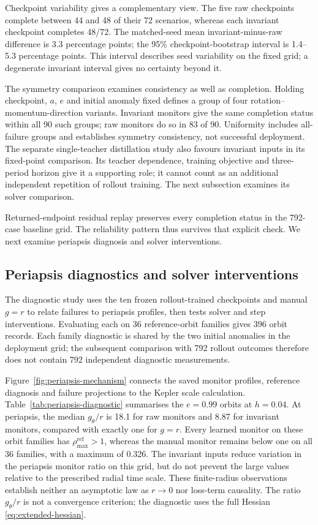 \documentclass[final,3p,times]{elsarticle}
\begin{document}
Checkpoint variability gives a complementary view. The five raw
checkpoints complete between 44 and 48 of their 72 scenarios, whereas
each invariant checkpoint completes 48/72. The matched-seed mean
invariant-minus-raw difference is 3.3 percentage points; the 95\%
checkpoint-bootstrap interval is 1.4--5.3 percentage points. This
interval describes seed variability on the fixed grid; a degenerate
invariant interval gives no certainty beyond it.

The symmetry comparison examines consistency as well as completion. Holding checkpoint, $a$, $e$ and initial anomaly fixed defines a
group of four rotation--momentum-direction variants. Invariant monitors
give the same completion status within all 90 such groups; raw monitors
do so in 83 of 90. Uniformity includes all-failure groups and establishes symmetry consistency,
not successful deployment.
The separate single-teacher distillation study also favours invariant
inputs in its fixed-point comparison. Its teacher dependence, training
objective and three-period horizon give it a supporting role; it cannot
count as an additional independent repetition of rollout training.
The next subsection examines its solver comparison.

Returned-endpoint residual replay preserves every completion status in
the 792-case baseline grid. The reliability pattern thus survives that
explicit check. We next examine periapsis diagnosis and solver interventions.

\subsection{Periapsis diagnostics and solver interventions}
\label{sec:periapsis-interventions}

The diagnostic study uses the ten frozen rollout-trained checkpoints and
manual $g=r$ to relate failures to periapsis profiles, then tests solver
and step interventions. Evaluating each
on 36 reference-orbit families gives 396 orbit records. Each family
diagnostic is shared by the two initial anomalies in the deployment grid;
the subsequent comparison with 792 rollout outcomes therefore does not
contain 792 independent diagnostic measurements.

Figure~\ref{fig:periapsis-mechanism} connects the saved monitor profiles,
reference diagnosis and failure projections to the Kepler scale
calculation. Table~\ref{tab:periapsis-diagnostic} summarises the $e=0.99$ orbits at
$h=0.04$. At periapsis, the median $g_\theta/r$ is 18.1 for raw monitors
and 8.87 for invariant monitors, compared with exactly one for $g=r$.
Every learned monitor on these orbit families has
$\rho_{\max}^{\mathrm{ref}}>1$, whereas the manual monitor remains below
one on all 36 families, with a maximum of 0.326. The invariant inputs
reduce variation in the periapsis monitor ratio on this grid, but do not
prevent the large values relative to the prescribed radial time scale.
These finite-radius observations establish neither an asymptotic law
as $r\to0$ nor loss-term causality. The ratio $g_\theta/r$ is not a
convergence criterion; the diagnostic uses the full Hessian
\eqref{eq:extended-hessian}.
\end{document}
